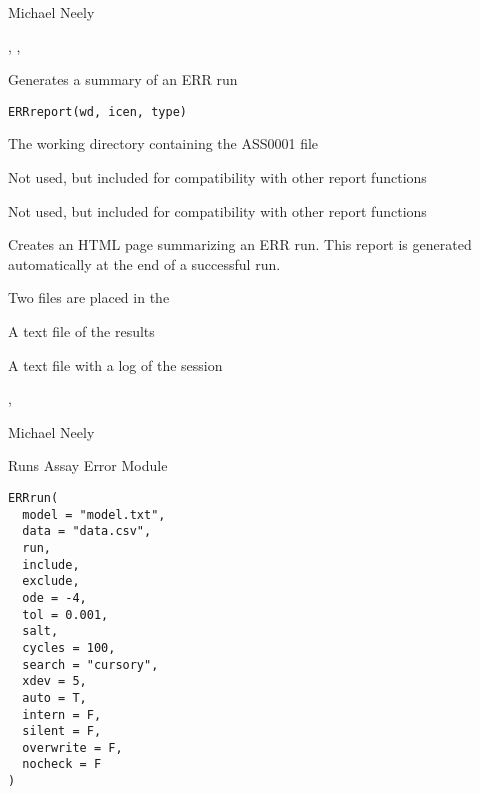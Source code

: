 \documentclass[a4paper]{book}
\begin{document}
%
\begin{Author}\relax
Michael Neely
\end{Author}
%
\begin{SeeAlso}\relax
{}, , 
\end{SeeAlso}
%
\begin{Description}\relax
Generates a summary of an ERR run
\end{Description}
%
\begin{Usage}
\begin{verbatim}
ERRreport(wd, icen, type)
\end{verbatim}
\end{Usage}
%
\begin{Arguments}
\begin{ldescription}
\item[\code{wd}] The working directory containing the ASS0001 file

\item[\code{icen}] Not used, but included for compatibility with other report functions

\item[\code{type}] Not used, but included for compatibility with other report functions
\end{ldescription}
\end{Arguments}
%
\begin{Details}\relax
Creates an HTML page summarizing an ERR run.  This report is generated
automatically at the end of a successful run.
\end{Details}
%
\begin{Value}
Two files are placed in the 
\begin{ldescription}
\item[\code{ASS0001 }] A text file of the results
\item[\code{errlog }] A text file with a log of the session\end{ldescription}
,
\end{Value}
%
\begin{Author}\relax
Michael Neely
\end{Author}
%
\begin{Description}\relax
Runs Assay Error Module
\end{Description}
%
\begin{Usage}
\begin{verbatim}
ERRrun(
  model = "model.txt",
  data = "data.csv",
  run,
  include,
  exclude,
  ode = -4,
  tol = 0.001,
  salt,
  cycles = 100,
  search = "cursory",
  xdev = 5,
  auto = T,
  intern = F,
  silent = F,
  overwrite = F,
  nocheck = F
)
\end{verbatim}
\end{Usage}
\end{document}
